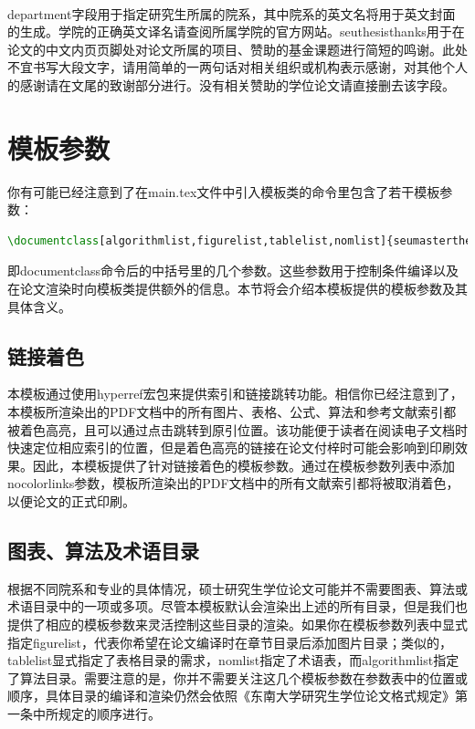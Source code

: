 ~

{\codefont department}字段用于指定研究生所属的院系，其中院系的英文名将用于英文封面的生成。学院的正确英文译名请查阅所属学院的官方网站。{\codefont seuthesisthanks}用于在论文的中文内页页脚处对论文所属的项目、赞助的基金课题进行简短的鸣谢。此处不宜书写大段文字，请用简单的一两句话对相关组织或机构表示感谢，对其他个人的感谢请在文尾的致谢部分进行。没有相关赞助的学位论文请直接删去该字段。

\section{模板参数}

你有可能已经注意到了在main.tex文件中引入模板类的命令里包含了若干模板参数：

\begin{tcolorbox}
\begin{lstlisting}[language=TeX]
\documentclass[algorithmlist,figurelist,tablelist,nomlist]{seumasterthesis}
\end{lstlisting}
\end{tcolorbox}

\noindent 即{\codefont documentclass}命令后的中括号里的几个参数。这些参数用于控制条件编译以及在论文渲染时向模板类提供额外的信息。本节将会介绍本模板提供的模板参数及其具体含义。

\subsection{链接着色}

本模板通过使用hyperref宏包来提供索引和链接跳转功能。相信你已经注意到了，本模板所渲染出的PDF文档中的所有图片、表格、公式、算法和参考文献索引都被着色高亮，且可以通过点击跳转到原引位置。该功能便于读者在阅读电子文档时快速定位相应索引的位置，但是着色高亮的链接在论文付梓时可能会影响到印刷效果。因此，本模板提供了针对链接着色的模板参数。通过在模板参数列表中添加{\codefont nocolorlinks}参数，模板所渲染出的PDF文档中的所有文献索引都将被取消着色，以便论文的正式印刷。

\subsection{图表、算法及术语目录}

根据不同院系和专业的具体情况，硕士研究生学位论文可能并不需要图表、算法或术语目录中的一项或多项。尽管本模板默认会渲染出上述的所有目录，但是我们也提供了相应的模板参数来灵活控制这些目录的渲染。如果你在模板参数列表中显式指定{\codefont figurelist}，代表你希望在论文编译时在章节目录后添加图片目录；类似的，{\codefont tablelist}显式指定了表格目录的需求，{\codefont nomlist}指定了术语表，而{\codefont algorithmlist}指定了算法目录。需要注意的是，你并不需要关注这几个模板参数在参数表中的位置或顺序，具体目录的编译和渲染仍然会依照《东南大学研究生学位论文格式规定》\cite{seugs2015rule}第一条中所规定的顺序进行。

